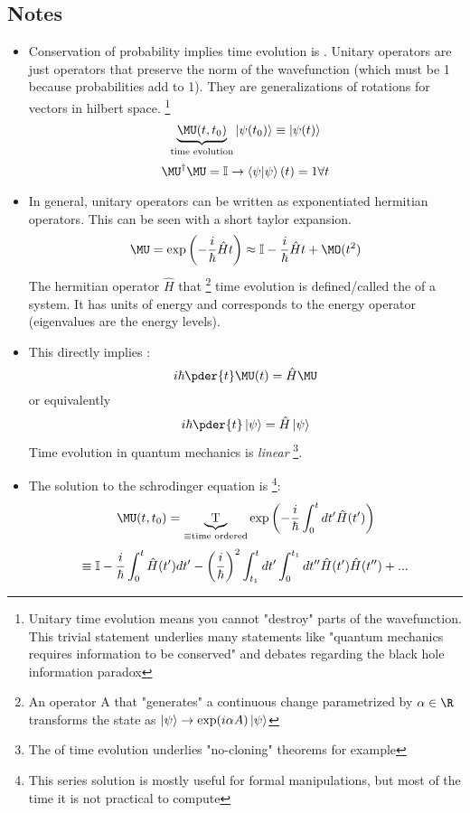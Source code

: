 \documentclass[10pt]{scrartcl}
\begin{document}
\subsection{Notes}
\begin{itemize}
	\item Conservation of probability implies time evolution is .  Unitary operators are just operators that preserve the norm of the wavefunction (which must be 1 because probabilities add to 1).  They are generalizations of rotations for vectors in hilbert space. 
	\footnote{Unitary time evolution means you cannot "destroy" parts of the wavefunction.  This trivial statement underlies many statements like "quantum mechanics requires information to be conserved" and debates regarding the black hole information paradox}
	\[ \underbrace{\MU(t, t_0)}_{\text{time evolution}} \ket{\psi(t_0)} \equiv \ket{\psi(t)} \]
	\[ \MU^\dagger \MU = \mathbb{I} \rightarrow \braket{\psi | \psi}(t) = 1 \forall t \]
	
	
	\item In general, unitary operators can be written as exponentiated hermitian operators. This can be seen with a short taylor expansion.
	\[ \MU = \exp \left(-{i \over \hbar} \hat{H} t \right) \approx \mathbb{I} - {i \over \hbar} \hat{H} t + \MO(t^2)\] 
	The hermitian operator $\hat{H}$ that  \footnote{An operator A that "generates" a continuous change parametrized by $\alpha \in \R$ transforms the state as $\ket{\psi} \rightarrow \exp(i \alpha A) \ket{\psi}$ } time evolution is defined/called the  of a system.  It has units of energy and corresponds to the energy operator (eigenvalues are the energy levels).
	\item This directly implies :
	\[ i \hbar \pder{t} \MU(t) = \hat{H} \MU \]
	or equivalently
	\[i \hbar \pder{t} \ket{\psi} = \hat{H} \ket{\psi} \]
	Time evolution in quantum mechanics is \emph{linear} \footnote{The  of time evolution underlies "no-cloning" theorems for example}.
	\item The  solution to the schrodinger equation is \footnote{This series solution is mostly useful for formal manipulations, but most of the time it is not practical to compute}:
	\[\MU(t, t_0) = \underbrace{ \text{T}}_{\equiv \text{time ordered}} \exp \left( - {i \over \hbar} \int_0^t dt' \hat{H} (t') \right)  \]
	\[ \equiv \mathbb{I} - {i \over \hbar} \int_0^{t}  \hat{H} (t') dt'  - \left({i \over \hbar} \right)^2 \int_{t_1}^{t} dt'  \int_{0}^{t_1} dt'' \hat{H}(t') \hat{H}(t'')  + ...\]
     

\end{itemize}
\end{document}
